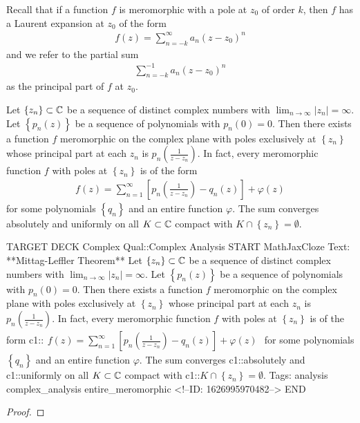 \documentclass{memoir}
\begin{document}


Recall that if a function \(f\) is meromorphic with a pole at \(z_0\) of order \(k\), then \(f\) has a Laurent expansion at \(z_0\) of the form
\begin{align*}
	f(z) = \sum_{n=-k}^{\infty} a_n (z-z_0)^{n}
\end{align*}
and we refer to the partial sum
\begin{align*}
	\sum_{n=-k}^{-1} a_n (z-z_0)^{n}
\end{align*}
as the principal part of \(f\) at \(z_0\).

\begin{thm}
	Let \(\left\{ z_n \right\} \subset \mathbb{C}\) be a sequence of distinct complex numbers with \( \lim_{n \to \infty} \left| z_n \right|= \infty \). Let \(\left\{ p_n(z) \right\} \) be a sequence of polynomials with \(p_n(0)=0\). Then there exists a function \(f\) meromorphic on the complex plane with poles exclusively at \(\left\{ z_n \right\} \) whose principal part at each \(z_n\) is \(p_n(\frac{1}{z-z_n})\). In fact, every meromorphic function \(f\) with poles at \(\left\{ z_n \right\} \) is of the form
	\begin{align*}
		f(z) = \sum_{n=1}^{\infty} \left[ p_n\left( \frac{1}{z-z_n} \right) - q_n(z) \right] + \varphi (z)
	\end{align*}
	for some polynomials \(\left\{ q_n \right\} \) and an entire function \(\varphi \). The sum converges absolutely and uniformly on all \(K\subset \mathbb{C}\) compact with \(K \cap \left\{ z_n \right\} = \emptyset\).
\end{thm}

\begin{anki}
TARGET DECK
Complex Qual::Complex Analysis
START
MathJaxCloze
Text: **Mittag-Leffler Theorem**
Let \(\left\{ z_n \right\} \subset \mathbb{C}\) be a sequence of distinct complex numbers with \( \lim_{n \to \infty} \left| z_n \right|= \infty \). Let \(\left\{ p_n(z) \right\} \) be a sequence of polynomials with \(p_n(0)=0\). Then there exists a function \(f\) meromorphic on the complex plane with poles exclusively at \(\left\{ z_n \right\} \) whose principal part at each \(z_n\) is \(p_n(\frac{1}{z-z_n})\). In fact, every meromorphic function \(f\) with poles at \(\left\{ z_n \right\} \) is of the form
{{c1::\(\begin{align*}
        	f(z) = \sum_{n=1}^{\infty} \left[ p_n\left( \frac{1}{z-z_n} \right) - q_n(z) \right] + \varphi (z)
        \end{align*}\)}}
for some polynomials \(\left\{ q_n \right\} \) and an entire function \(\varphi \). The sum converges {{c1::absolutely}} and {{c1::uniformly}} on all \(K\subset \mathbb{C}\) compact with {{c1::\(K \cap \left\{ z_n \right\} = \emptyset\)}}.
Tags: analysis complex_analysis entire_meromorphic
<!--ID: 1626995970482-->
END
\end{anki}


\begin{proof}
\end{proof}

\end{document}
